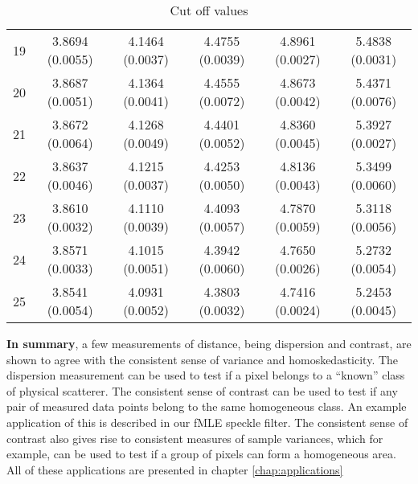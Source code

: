 \begin{table}
\begin{tabular}{c|c|c|c|c|c}
19  &3.8694 (0.0055)  &4.1464 (0.0037)  &4.4755 (0.0039)  &4.8961 (0.0027)  &5.4838 (0.0031)\\
20  &3.8687 (0.0051)  &4.1364 (0.0041)  &4.4555 (0.0072)  &4.8673 (0.0042)  &5.4371 (0.0076)\\
21  &3.8672 (0.0064)  &4.1268 (0.0049)  &4.4401 (0.0052)  &4.8360 (0.0045)  &5.3927 (0.0027)\\
22  &3.8637 (0.0046)  &4.1215 (0.0037)  &4.4253 (0.0050)  &4.8136 (0.0043)  &5.3499 (0.0060)\\
23  &3.8610 (0.0032)  &4.1110 (0.0039)  &4.4093 (0.0057)  &4.7870 (0.0059)  &5.3118 (0.0056)\\
24  &3.8571 (0.0033)  &4.1015 (0.0051)  &4.3942 (0.0060)  &4.7650 (0.0026)  &5.2732 (0.0054)\\
25  &3.8541 (0.0054)  &4.0931 (0.0052)  &4.3803 (0.0032)  &4.7416 (0.0024)  &5.2453 (0.0045)
\end{tabular}

\caption{Cut off values}
\label{tab:var_cut_off_values}
\end{table}

\textbf{In summary}, a few measurements of distance, being dispersion and contrast, are shown to agree with the consistent sense of variance and homoskedasticity.
The dispersion measurement can be used to test 
if a pixel belongs to a ``known'' class of physical scatterer.
The consistent sense of contrast can be used to test if any pair of measured data points belong to  the same homogeneous class.
An example application of this is described in our fMLE speckle filter.
The consistent sense 
of contrast also gives rise to consistent measures of sample variances, which for example, can be used to test 
if a group of pixels can form a homogeneous area.
All of these applications are presented in chapter \ref{chap:applications}
